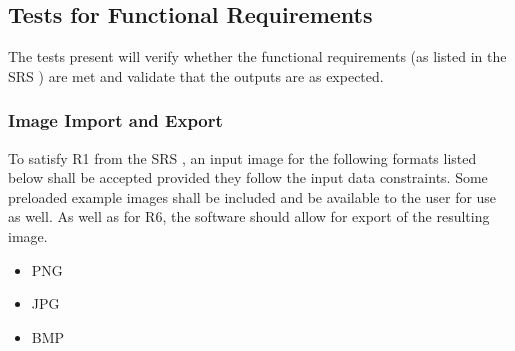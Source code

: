 \documentclass[12pt, titlepage]{article}
\begin{document}
\subsection{Tests for Functional Requirements}

The tests present will verify whether the functional requirements 
(as listed in the SRS \cite{SRS}) are met and validate that the outputs
are as expected.

\subsubsection{Image Import and Export} \label{subsec_img_io}

To satisfy R1 from the SRS \citep{SRS}, an input image for the following formats listed below shall be 
accepted provided they follow the input data constraints.
Some preloaded example images shall be included and be available to the user for use as well.
As well as for R6, the software should allow for export of the resulting image.

\begin{itemize}
  \item{PNG}
  \item{JPG}
  \item{BMP\\}
\end{itemize}
\end{document}
